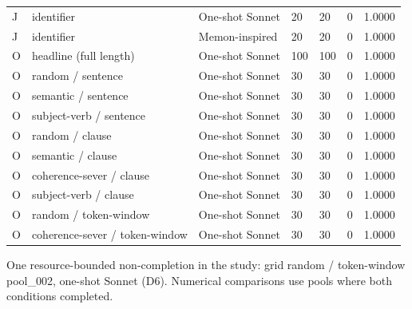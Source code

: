 \begin{table}[t]
{\begin{tabular}{lllllll}
J & identifier & One-shot Sonnet & 20 & 20 & 0 & 1.0000 \\
J & identifier & Memon-inspired & 20 & 20 & 0 & 1.0000 \\
O & headline (full length) & One-shot Sonnet & 100 & 100 & 0 & 1.0000 \\
O & random / sentence & One-shot Sonnet & 30 & 30 & 0 & 1.0000 \\
O & semantic / sentence & One-shot Sonnet & 30 & 30 & 0 & 1.0000 \\
O & subject-verb / sentence & One-shot Sonnet & 30 & 30 & 0 & 1.0000 \\
O & random / clause & One-shot Sonnet & 30 & 30 & 0 & 1.0000 \\
O & semantic / clause & One-shot Sonnet & 30 & 30 & 0 & 1.0000 \\
O & coherence-sever / clause & One-shot Sonnet & 30 & 30 & 0 & 1.0000 \\
O & subject-verb / clause & One-shot Sonnet & 30 & 30 & 0 & 1.0000 \\
O & random / token-window & One-shot Sonnet & 30 & 30 & 0 & 1.0000 \\
O & coherence-sever / token-window & One-shot Sonnet & 30 & 30 & 0 & 1.0000 \\
\bottomrule
\end{tabular}}
\par\smallskip\parbox{\linewidth}{\tiny One resource-bounded non-completion in the study: grid random / token-window pool\_002, one-shot Sonnet (D6). Numerical comparisons use pools where both conditions completed.}
\end{table}
